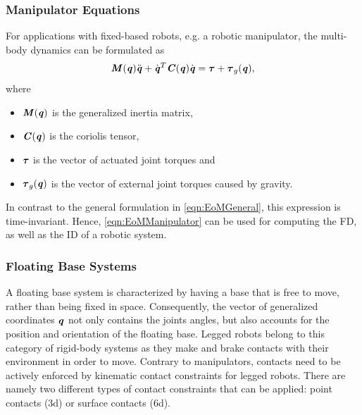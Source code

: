 \subsubsection{Manipulator Equations}
For applications with fixed-based robots, e.g. a robotic manipulator, the multi-body dynamics can be formulated as
\begin{equation} \label{eqn:EoMManipulator}
\bm{\mathit{M}}(\bm{\mathit{q}})\ddot{\bm{\mathit{q}}}+\dot{\bm{\mathit{q}}}^T\bm{\mathit{C}}(\bm{\mathit{q}})\dot{\bm{\mathit{q}}}=\bm{\mathit{\tau}}+\bm{\mathit{\tau}}_g(\bm{\mathit{q}}),
\end{equation}
where 
\begin{itemize}
\item $\bm{\mathit{M}}(\bm{\mathit{q}})$ is the generalized inertia matrix, 
\item $\bm{\mathit{C}}(\bm{\mathit{q}})$ is the coriolis tensor, 
\item $\bm{\mathit{\tau}}$ is the vector of actuated joint torques and 
\item $\bm{\mathit{\tau}}_g(\bm{\mathit{q}})$ is the vector of external joint torques caused by gravity.
\end{itemize}
In contrast to the general formulation in \cref{eqn:EoMGeneral}, this expression is time-invariant. Hence, \cref{eqn:EoMManipulator} can be used for computing the \gls{FD}, as well as the \gls{ID} of a robotic system.
\subsubsection{Floating Base Systems}
A floating base system is characterized by having a base that is free to move, rather than being fixed in space. Consequently, the vector of generalized coordinates $\bm{\mathit{q}}$ not only contains the joints angles, but also accounts for the position and orientation of the floating base. Legged robots belong to this category of rigid-body systems as they make and brake contacts with their environment in order to move. Contrary to manipulators, contacts need to be actively enforced by kinematic contact constraints for legged robots. There are namely two different types of contact constraints that can be applied: point contacts (3d) or surface contacts (6d). 

